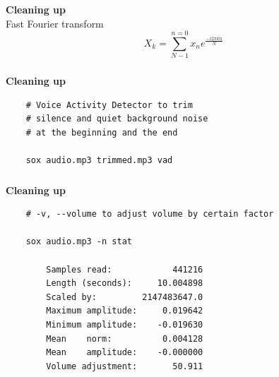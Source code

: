 \documentclass[usenames,dvipsnames, 18pt, compress, aspectratio=169]{beamer}
\begin{document}
\begin{frame}[fragile]{}
    \frametitle{}
    \begin{center}
        \textbf{Cleaning up}
        \vspace{0.2cm}
        \\ Fast Fourier transform \\

        \huge
        \begin{equation*}
        X_k = \sum_{N-1}^{n=0} x_n e^{\frac{-i 2\pi kn}{N}}
        \end{equation*}

    \end{center}
\end{frame}

\begin{frame}[fragile]{}
    \frametitle{}
    \begin{center}
        \textbf{Cleaning up}
        \vspace{0.2cm}

        \begin{verbatim}
    # Voice Activity Detector to trim
    # silence and quiet background noise
    # at the beginning and the end

    sox audio.mp3 trimmed.mp3 vad

        \end{verbatim}

    \end{center}
\end{frame}

\begin{frame}[fragile]{}
    \frametitle{}
    \begin{center}
        \textbf{Cleaning up}
        \vspace{0.2cm}

        \begin{verbatim}
    # -v, --volume to adjust volume by certain factor

    sox audio.mp3 -n stat

        Samples read:            441216
        Length (seconds):     10.004898
        Scaled by:         2147483647.0
        Maximum amplitude:     0.019642
        Minimum amplitude:    -0.019630
        Mean    norm:          0.004128
        Mean    amplitude:    -0.000000
        Volume adjustment:       50.911
        \end{verbatim}

    \end{center}
\end{frame}
\end{document}

